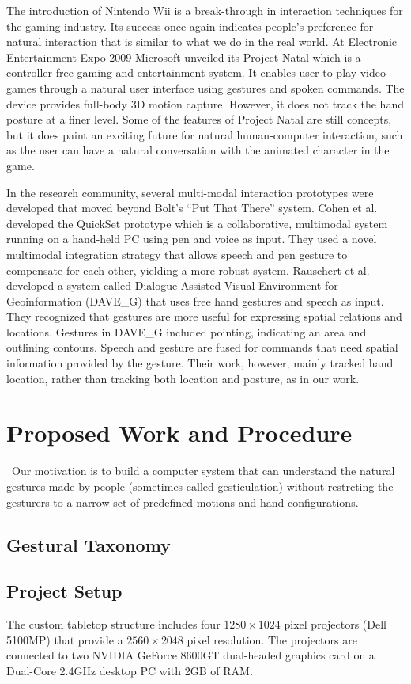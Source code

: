 The introduction of Nintendo Wii is a break-through in interaction techniques for the gaming industry. Its success once again indicates people's preference for natural interaction that is similar to what we do in the real world. At Electronic Entertainment Expo 2009 Microsoft unveiled its Project Natal which is a controller-free gaming and entertainment system. It enables user to play video games through a natural user interface using gestures and spoken commands. The device provides full-body 3D motion capture. However, it does not track the hand posture at a finer level. Some of the features of Project Natal are still concepts, but it does paint an exciting future for natural human-computer interaction, such as the user can have a natural conversation with the animated character in the game.

In the research community, several multi-modal interaction prototypes were developed that moved beyond Bolt's ``Put That There'' system. Cohen et al. \cite{Cohen97} developed the QuickSet prototype which is a collaborative, multimodal system running on a hand-held PC using pen and voice as input. They used a novel multimodal integration strategy that allows speech and pen gesture to compensate for each other, yielding a more robust system. Rauschert et al. \cite{Rauschert02} developed a system called Dialogue-Assisted Visual Environment for Geoinformation (DAVE\_G) that uses free hand gestures and speech as input. They recognized that gestures are more useful for expressing spatial relations and locations. Gestures in DAVE\_G included pointing, indicating an area and outlining contours. Speech and gesture are fused for commands that need spatial information provided by the gesture. Their work, however, mainly tracked hand location, rather than tracking both location and posture, as in our work.

\section{Proposed Work and Procedure}\
Our motivation is to build a computer system that can understand the natural
gestures made by people (sometimes called gesticulation) without restrcting the
gesturers to a narrow set of predefined motions and hand configurations.

\subsection{Gestural Taxonomy}

\subsection{Project Setup}
The custom tabletop structure includes four $1280\times1024$ pixel projectors (Dell 5100MP) that provide a $2560\times2048$ pixel resolution. The projectors are connected to two NVIDIA GeForce 8600GT dual-headed graphics card on a Dual-Core 2.4GHz desktop PC with 2GB of RAM.

